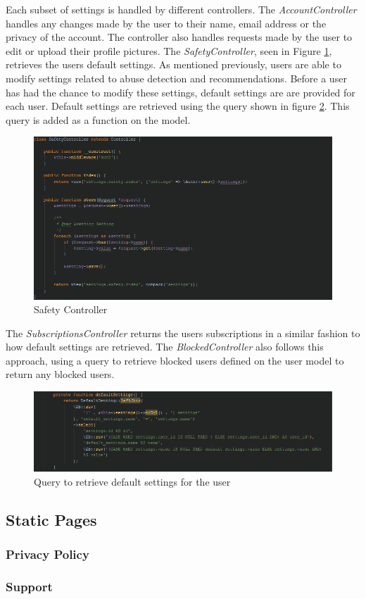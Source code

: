 Each subset of settings is handled by different controllers. The \textit{AccountController} handles any changes made by the user to their name, email address or the privacy of the account. The controller also handles requests made by the user to edit or upload their profile pictures. The \textit{SafetyController}, seen in Figure \ref{fig:SafetyController}, retrieves the users default settings. As mentioned previously, users are able to modify settings related to abuse detection and recommendations. Before a user has had the chance to modify these settings, default settings are are provided for each user. Default settings are retrieved using the query shown in figure \ref{fig:UserDefaultSettings}. This query is added as a function on the model.

\begin{figure}[H]
\centering
\includegraphics[width=\textwidth]{Images/Implementation/SafetyController}
\caption{Safety Controller}
\label{fig:SafetyController}
\end{figure}

The \textit{SubscriptionsController} returns the users subscriptions in a similar fashion to how default settings are retrieved. The \textit{BlockedController} also follows this approach, using a query to retrieve blocked users defined on the user model to return any blocked users.

\begin{figure}[H]
\centering
\includegraphics[width=\textwidth]{Images/Implementation/UserDefaultSettings}
\caption{Query to retrieve default settings for the user}
\label{fig:UserDefaultSettings}
\end{figure}

\subsection{Static Pages}
\subsubsection{Privacy Policy}
\subsubsection{Support}